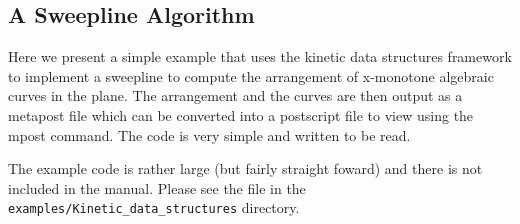 

\subsection{A Sweepline Algorithm}
\label{sec:sweepline_example}

Here we present a simple example that uses the kinetic data structures
framework to implement a sweepline to compute the arrangement of
x-monotone algebraic curves in the plane. The arrangement and the
curves are then output as a metapost file which can be converted into
a postscript file to view using the mpost command. The code is very
simple and written to be read.

The example code is rather large (but fairly straight foward) and
there is not included in the manual. Please see the file in the
\texttt{examples/Kinetic\_data\_structures} directory.

